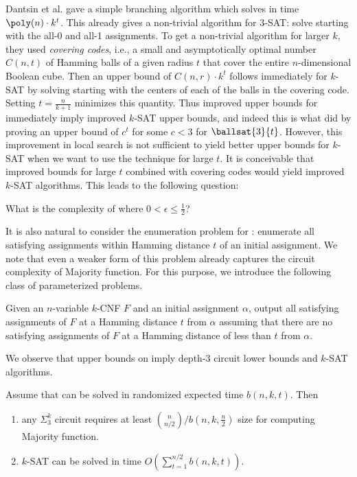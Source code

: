 \bigskip
Dantsin et al. \cite{DantsinGHKKPRS02} gave a simple branching algorithm which solves  in time $\poly(n) \cdot k^t$. This already gives a non-trivial algorithm for 3-SAT: solve  
starting with the all-0  and all-1 assignments. To get a non-trivial algorithm for larger $k$, they used \emph{covering codes}, i.e., a small and asymptotically optimal number $C(n, t)$ of Hamming balls of a given radius $t$ that cover the entire $n$-dimensional Boolean cube. Then an upper bound of $C(n, r)\cdot k^t$ follows immediately for $k$-SAT by solving  starting with 
the centers of each of the balls in the covering code. Setting $t = \frac{n}{k + 1}$ minimizes this quantity. 
Thus improved upper bounds 
for  immediately imply 
improved $k$-SAT upper bounds, 
and indeed this is what \cite{BrueggemannK04,KS} did  by
proving an upper bound of $c^t$ for some $c < 3$ for $\ballsat{3}{t}$.
However, this improvement in local search is not
sufficient to yield better upper  
bounds for $k$-SAT when we want to use the technique for large $t$. It is conceivable that improved bounds for large $t$ combined with covering codes would yield improved $k$-SAT algorithms. This leads to the following question:

\begin{question}
What is the complexity of  where $0 < \epsilon \le \frac{1}{2}$?
\end{question}

It is also natural to consider the enumeration problem for : 
enumerate all satisfying assignments within Hamming distance $t$ of an 
initial assignment. We note that even a weaker form of this problem 
already captures the circuit complexity of Majority function. For 
this purpose, we introduce the following class of parameterized problems.

\bigskip
{} Given an $n$-variable $k$-CNF $F$ 
and an initial assignment $\alpha$, 
output all satisfying assignments of $F$ at a Hamming distance $t$
from $\alpha$ assuming that there are no satisfying assignments
of $F$ at a Hamming distance of less than $t$ from $\alpha$.

\bigskip
We observe that upper bounds on  imply depth-3 circuit lower bounds and $k$-SAT algorithms.

\begin{proposition}
Assume that  can be solved in randomized expected time $b(n, k, t)$. Then 
\begin{enumerate}
	\item any $\Sigma^k_3$ circuit requires at least $\binom{n}{n/2}/b(n, k, \frac{n}{2})$ size for computing Majority function.
	\item $k$-SAT can be solved in time $O(\sum_{t = 1}^{n/2}b(n, k, t))$.
\end{enumerate}
\end{proposition}



